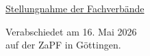 \documentclass[DIV=calc]{scrartcl}
\begin{document}
\href{https://diefachverbaende.de/files/stellungnahmen/20251205_Stellungnahme_Die_Fachverbaende_BGG.pdf}{Stellungnahme der Fachverbände}




\vspace{1cm} 
%
\vfill
\begin{flushright}
	Verabschiedet am 16. Mai 2026 \\
	auf der ZaPF in Göttingen.
\end{flushright}
\end{document}
